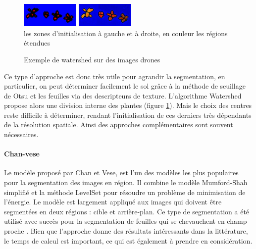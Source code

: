 \documentclass[../thesis.tex]{subfiles}
\begin{document}
    \begin{figure}[H]
        \centering
        \includegraphics[width=0.25\textwidth]{img/biblio/segmentation-watershed-init}
        \includegraphics[width=0.25\textwidth]{img/biblio/segmentation-watershed} \\
        {\scriptsize les zones d'initialisation à gauche et à droite, en couleur les régions étendues}
        \caption{Exemple de watershed sur des images drones}
        \label{fig:03-watershed-region}
    \end{figure}
    
    Ce type d'approche est donc très utile pour agrandir la segmentation, en particulier, on peut déterminer facilement le sol grâce à la méthode de seuillage de Otsu et les feuilles via des descripteurs de texture. L'algorithme Watershed propose alors une division interne des plantes (figure \ref{fig:03-watershed-region}). Mais le choix des centres reste difficile à déterminer, rendant l'initialisation de ces derniers très dépendants de la résolution spatiale. Ainsi des approches complémentaires sont souvent nécessaires.
    
    
    \paragraph{Chan-vese}
    Le modèle proposé par Chan et Vese, est l'un des modèles les plus populaires pour la segmentation des images en région. Il combine le modèle Mumford-Shah simplifié et la méthode LevelSet pour résoudre un problème de minimisation de l'énergie. Le modèle est largement appliqué aux images qui doivent être segmentées en deux régions : cible et arrière-plan. Ce type de segmentation a été utilisé avec succès pour la segmentation de feuilles qui se chevauchent en champ proche \cite{WANG20181}. Bien que l'approche donne des résultats intéressants dans la littérature, le temps de calcul est important, ce qui est également à prendre en considération.
    
\end{document}
